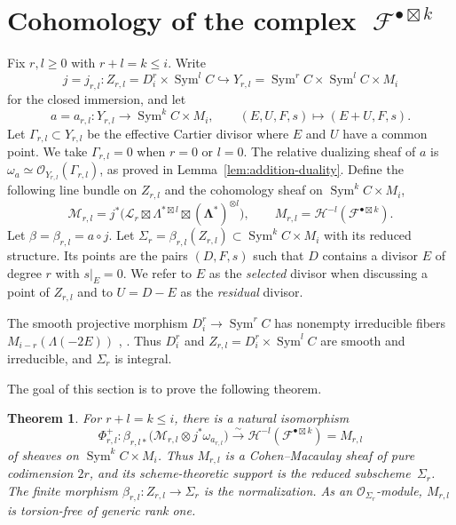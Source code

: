 \documentclass[11pt,letterpaper]{amsart}
\theoremstyle{plain}
\newtheorem{theorem}{Theorem}[section]
\theoremstyle{definition}
\theoremstyle{remark}
\numberwithin{equation}{section}
\DeclareMathOperator{\Sym}{Sym}
\DeclareMathOperator{\cF}{\mathcal{F}}
\begin{document}
\section{Cohomology of the complex ${\cF^{\bullet\boxtimes k}}$}\label{asrgarsgargaerhaehae}

Fix $r,l\ge0$ with $r+l=k\le i$. Write
\[
 j=j_{r,l}:Z_{r,l}=D_i^r\times\Sym^lC
 \hookrightarrow Y_{r,l}=\Sym^rC\times\Sym^lC\times M_i
\]
for the closed immersion, and let
\[
 a=a_{r,l}:Y_{r,l}\longrightarrow\Sym^kC\times M_i,
 \qquad(E,U,F,s)\longmapsto(E+U,F,s).
\]
Let $\Gamma_{r,l}\subset Y_{r,l}$ be the effective Cartier divisor
where $E$ and $U$ have a common point. We take $\Gamma_{r,l}=0$
when $r=0$ or $l=0$.
The relative dualizing sheaf of $a$ is
$\omega_a\simeq\mathcal O_{Y_{r,l}}(\Gamma_{r,l})$, as proved in
Lemma~\ref{lem:addition-duality}.
Define the following line bundle on $Z_{r,l}$ and the cohomology sheaf on $\Sym^kC\times M_i$,
\begin{equation}\label{eq:corrected-incidence-lines}
 \mathscr M_{r,l}
 =j^*\bigl(\mathscr L_r\boxtimes\Lambda^{*\boxtimes l}
                     \boxtimes(\boldsymbol\Lambda^*)^{\otimes l}\bigr),
 \qquad
 M_{r,l}=\mathcal H^{-l}(\mathcal F^{\bullet\boxtimes k}).
\end{equation}
Let $\beta=\beta_{r,l}=a\circ j$.
Let $\Sigma_r=\beta_{r,l}(Z_{r,l})\subset {\Sym^kC\times M_i}$ with its reduced structure.
Its points are the pairs $(D,F,s)$ such that $D$ contains a divisor
$E$ of degree $r$ with $s|_E=0$.  We refer to $E$ as the {\em selected}
divisor when discussing a point of $Z_{r,l}$
and to $U=D-E$ as the {\em residual}
divisor.


The smooth projective morphism $D_i^r\to\Sym^rC$ has nonempty
irreducible fibers $M_{i-r}(\Lambda(-2E))$
\cite[Remark~3.7]{TT}, \cite[(3.1), (3.6)]{thaddeus}.
Thus $D_i^r$ and $Z_{r,l}=D_i^r\times\Sym^lC$ are smooth and
irreducible, and $\Sigma_r$ is integral.


The goal of this section is to prove the following theorem.

\begin{theorem}\label{sdfgnsfghsftjt}
For $r+l=k\le i$, there is a natural isomorphism
\begin{equation}\label{eq:corrected-cohomology}
 \Phi^+_{r,l}:\beta_{r,l*}\bigl(\mathscr M_{r,l}\otimes j^*\omega_{a_{r,l}}\bigr)
 \xrightarrow{\sim}
 \mathcal H^{-l}(\mathcal F^{\bullet\boxtimes k})=M_{r,l}
\end{equation}
of sheaves on $\Sym^kC\times M_i$.
Thus $M_{r,l}$ is a Cohen--Macaulay sheaf of pure codimension $2r$, and its
scheme-theoretic support is the reduced subscheme~$\Sigma_r$.
The finite morphism
$\beta_{r,l}:Z_{r,l}\to\Sigma_r$ is the
normalization.  As an $\mathcal O_{\Sigma_r}$-module, $M_{r,l}$ is
torsion-free of generic rank one.
\end{theorem}
\end{document}
